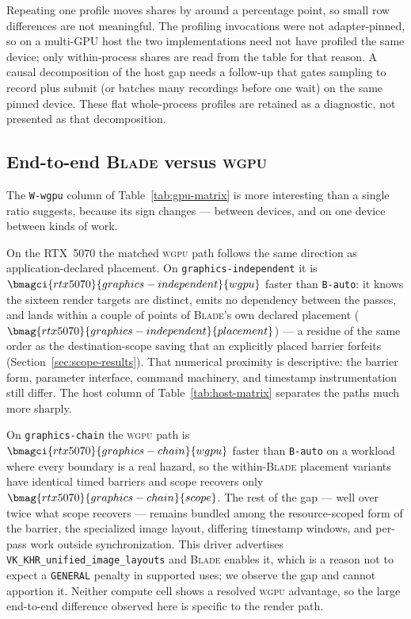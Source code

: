 \documentclass[10pt,twocolumn]{article}
\newcommand{\blade}{\textsc{Blade}}
\newcommand{\wgpu}{\textsc{wgpu}}
\begin{document}
Repeating one profile moves shares by around a percentage point, so small row
differences are not meaningful. The profiling invocations were not
adapter-pinned, so on a multi-GPU host the two implementations need not have
profiled the same device; only within-process shares are read from the table
for that reason. A causal decomposition
of the host gap needs a follow-up that gates sampling to record plus submit (or
batches many recordings before one wait) on the same pinned device. These flat
whole-process profiles are retained as a diagnostic, not presented as that
decomposition.

\subsection{End-to-end \blade{} versus \wgpu}
\label{sec:endtoend}

The \texttt{W-wgpu} column of Table~\ref{tab:gpu-matrix} is more interesting
than a single ratio suggests, because its sign changes --- between devices,
and on one device between kinds of work.

On the RTX~5070 the matched \wgpu{} path follows the same direction as
application-declared placement. On \texttt{graphics-independent} it is
$\bmagci{rtx5070}{graphics-independent}{wgpu}$ faster than \texttt{B-auto}:
it knows the sixteen render targets are distinct, emits no dependency between
the passes, and lands within a couple of points of \blade's own declared
placement ($\bmag{rtx5070}{graphics-independent}{placement}$) --- a residue of
the same order as the destination-scope saving that an explicitly placed
barrier forfeits (Section~\ref{sec:scope-results}). That numerical proximity is
descriptive: the barrier form, parameter interface, command machinery, and
timestamp instrumentation still differ. The host column of
Table~\ref{tab:host-matrix} separates the paths much more sharply.

On \texttt{graphics-chain} the \wgpu{} path is
$\bmagci{rtx5070}{graphics-chain}{wgpu}$ faster
than \texttt{B-auto} on a workload where every boundary is a real hazard, so
the within-\blade{} placement variants have identical timed barriers and scope
recovers only
$\bmag{rtx5070}{graphics-chain}{scope}$. The rest of the gap --- well over
twice what scope recovers --- remains bundled among the resource-scoped form of
the barrier, the specialized image layout, differing timestamp windows, and
per-pass work outside synchronization. This driver advertises
\texttt{VK\_KHR\_unified\_image\_layouts} and \blade{} enables it, which is a
reason not to expect a \texttt{GENERAL} penalty in supported uses; we observe
the gap and cannot apportion it. Neither compute cell shows a resolved
\wgpu{} advantage, so the large end-to-end difference observed here is
specific to the render path.
\end{document}
